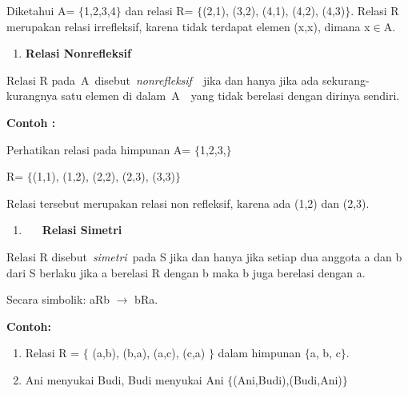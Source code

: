 \documentclass[11pt,fleqn]{book} %
\begin{document}
\noindent 

\noindent Diketahui A= $\{$1,2,3,4$\}$ dan relasi R= $\{$(2,1), (3,2), (4,1), (4,2), (4,3)$\}$. Relasi R merupakan relasi irrefleksif, karena tidak terdapat elemen (x,x), dimana x$\mathrm{\in }$A.



\begin{enumerate}
\item  \textbf{Relasi Nonrefleksif}
\end{enumerate}

\noindent 

\noindent Relasi R pada~A~disebut~\textit{nonrefleksif}~~jika dan hanya jika ada sekurang-kurangnya satu elemen di dalam~A~~yang tidak berelasi dengan dirinya sendiri.

\noindent 

\noindent \textbf{Contoh :}

\noindent \textbf{}

\noindent Perhatikan relasi pada himpunan A= $\{$1,2,3,$\}$

\noindent R= $\{$(1,1), (1,2), (2,2), (2,3), (3,3)$\}$

\noindent Relasi tersebut merupakan relasi non refleksif, karena ada (1,2) dan (2,3).

\noindent 

\noindent 

\begin{enumerate}
\item  ~~~\textbf{Relasi Simetri}
\end{enumerate}

\noindent 

\noindent Relasi R disebut~\textit{simetri}~pada S jika dan hanya jika setiap dua anggota a dan b dari S berlaku jika a berelasi R dengan b maka b juga berelasi dengan a. 

\noindent Secara simbolik: aRb $\mathrm{\to}$ bRa.

\noindent 

\noindent \textbf{Contoh:}

\begin{enumerate}
\item \textbf{ }Relasi R = $\{$ (a,b), (b,a), (a,c), (c,a) $\}$ dalam himpunan $\{$a, b, c$\}$.

\item  Ani menyukai Budi, Budi menyukai Ani $\{$(Ani,Budi),(Budi,Ani)$\}$
\end{enumerate}

\noindent 
\end{document}
